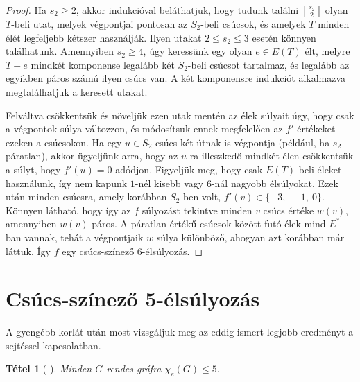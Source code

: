\documentclass[12pt, a4paper]{report}
\newtheorem{tét}{Tétel}[section]
\theoremstyle{remark}
\theoremstyle{definition}
\begin{document}
\begin{proof}
Ha $s_2 \geq 2$, akkor indukcióval beláthatjuk, hogy tudunk találni $\left\lceil \frac{s_2}{2} \right\rceil$ olyan $T$-beli utat, melyek végpontjai pontosan az $S_2$-beli csúcsok, és amelyek $T$ minden élét legfeljebb kétszer használják. Ilyen utakat $2 \leq s_2 \leq 3$ esetén könnyen találhatunk. Amennyiben $s_2 \geq 4$, úgy keressünk egy olyan $e \in E(T)$ élt, melyre $T-e$ mindkét komponense legalább két $S_2$-beli csúcsot tartalmaz, és legalább az egyikben páros számú ilyen csúcs van. A két komponensre indukciót alkalmazva megtalálhatjuk a keresett utakat.

Felváltva csökkentsük és növeljük ezen utak mentén az élek súlyait úgy, hogy csak a végpontok súlya változzon, és módosítsuk ennek megfelelően az $f'$ értékeket ezeken a csúcsokon. Ha egy $u \in S_2$ csúcs két útnak is végpontja (például, ha $s_2$ páratlan), akkor ügyeljünk arra, hogy az $u$-ra illeszkedő mindkét élen csökkentsük a súlyt, hogy $f'(u) = 0$ adódjon. Figyeljük meg, hogy csak $E(T)$-beli éleket használunk, így nem kapunk $1$-nél kisebb vagy $6$-nál nagyobb élsúlyokat. Ezek után minden csúcsra, amely korábban $S_2$-ben volt, $f'(v) \in \lbrace -3,\ -1,\ 0 \rbrace$. Könnyen látható, hogy így az $f$ súlyozást tekintve minden $v$ csúcs értéke $w(v)$, amennyiben $w(v)$ páros. A páratlan értékű csúcsok között futó élek mind $E^*$-ban vannak, tehát a végpontjaik $w$ súlya különböző, ahogyan azt korábban már láttuk. Így $f$ egy csúcs-színező $6$-élsúlyozás.
\end{proof}

\section{Csúcs-színező 5-élsúlyozás}
A gyengébb korlát után most vizsgáljuk meg az eddig ismert legjobb eredményt a sejtéssel kapcsolatban. 

\begin{tét}[\citeauthor{Kalkowski2010} \cite{Kalkowski2010}]
Minden $G$ rendes gráfra $\chi_e(G) \leq 5$.
\end{tét}
\end{document}
